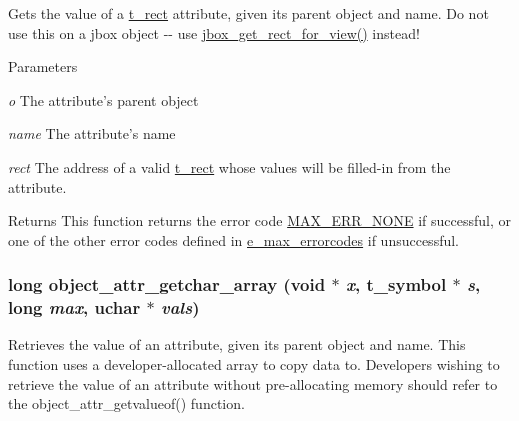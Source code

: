 Gets the value of a \hyperlink{structt__rect}{t\_\-rect} attribute, given its parent object and name. Do not use this on a jbox object -\/-\/ use \hyperlink{group__jbox_gab47a7fa918c470f60f0789baafaa7b4b}{jbox\_\-get\_\-rect\_\-for\_\-view()} instead!


\begin{DoxyParams}{Parameters}
\item[{\em o}]The attribute's parent object \item[{\em name}]The attribute's name \item[{\em rect}]The address of a valid \hyperlink{structt__rect}{t\_\-rect} whose values will be filled-\/in from the attribute.\end{DoxyParams}
\begin{DoxyReturn}{Returns}
This function returns the error code \hyperlink{group__misc_gga0764dd6c02b76cca7d053ae50555d69da6d22f77fef8b1e1b074cef5d29d935fd}{MAX\_\-ERR\_\-NONE} if successful, or one of the other error codes defined in \hyperlink{group__misc_ga0764dd6c02b76cca7d053ae50555d69d}{e\_\-max\_\-errorcodes} if unsuccessful. 
\end{DoxyReturn}
\hypertarget{group__attr_ga7115b0e5df05d5192a10039a2a7ae616}{
\subsubsection[{object\_\-attr\_\-getchar\_\-array}]{\setlength{\rightskip}{0pt plus 5cm}long object\_\-attr\_\-getchar\_\-array (void $\ast$ {\em x}, \/  {\bf t\_\-symbol} $\ast$ {\em s}, \/  long {\em max}, \/  {\bf uchar} $\ast$ {\em vals})}}
\label{group__attr_ga7115b0e5df05d5192a10039a2a7ae616}


Retrieves the value of an attribute, given its parent object and name. This function uses a developer-\/allocated array to copy data to. Developers wishing to retrieve the value of an attribute without pre-\/allocating memory should refer to the object\_\-attr\_\-getvalueof() function.


